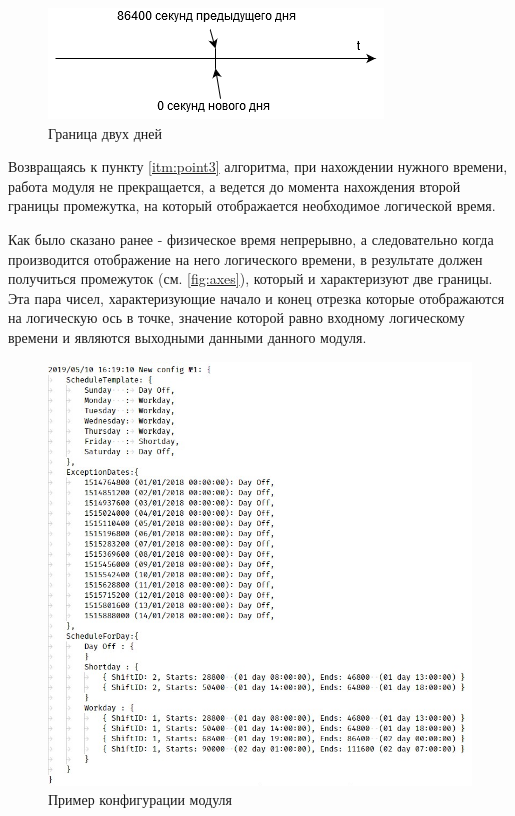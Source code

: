 \begin{figure}[h]
	\includegraphics[width=\linewidth]{pics/scheduleTime.png}
	\caption{Граница двух дней}
	\label{fig:time}
	\centering
\end{figure}

\indent Возвращаясь к пункту \ref{itm:point3} алгоритма, при нахождении нужного времени, работа модуля не прекращается, а ведется до момента нахождения второй границы промежутка, на который отображается необходимое логической время.

\indent Как было сказано ранее - физическое время непрерывно, а следовательно когда производится отображение на него логического времени, в результате должен получиться промежуток (см. \ref{fig:axes}), который и характеризуют две границы.
Эта пара чисел, характеризующие начало и конец отрезка которые отображаются на логическую ось в точке, значение которой равно входному логическому времени и являются выходными данными данного модуля.

\begin{figure}[ht]
	\includegraphics[scale=0.7]{pics/scheduleConfigExample.png}
	\caption{Пример конфигурации модуля}
	\label{fig:config}
	\centering
\end{figure}

